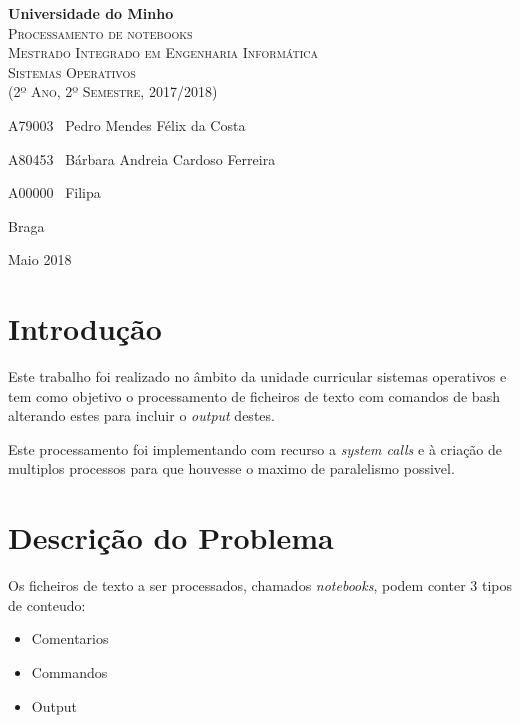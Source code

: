 \documentclass[12pt,a4paper]{report}
\begin{document}
\newcommand{\outputStart}[0]{$>>>$}
\newcommand{\outputEnd}[0]{$<<<$}

\begin{titlepage}
    \center
    {\huge {\bf Universidade do Minho}}\\[0.4cm]
    \vspace{3.0cm}
    \textsc{\huge{Processamento de notebooks}}\\[0.5cm]
    \vspace{3.0cm}
    \textsc{\huge{Mestrado Integrado em Engenharia Informática}}\\[0.5cm]
    \vspace{2.0cm}
    \textsc{Sistemas Operativos}\\[0.5cm]
    \textsc{(2º Ano, 2º Semestre, 2017/2018)}\\[0.5cm]
    \vspace{1.5cm}
    \begin{flushleft}
        A79003 \,\,\,Pedro Mendes Félix da Costa
        \vspace{0.2cm}

        A80453 \,\,\,Bárbara Andreia Cardoso Ferreira
        \vspace{0.2cm}

        A00000 \,\,\,Filipa
    \end{flushleft}
        \vspace{1cm}
    \begin{flushright}
        Braga

        Maio 2018
    \end{flushright}

\end{titlepage}

\tableofcontents
\clearpage

\chapter{Introdução}
    Este trabalho foi realizado no âmbito da unidade curricular sistemas
    operativos e tem como objetivo o processamento de ficheiros de texto
    com comandos de bash alterando estes para incluir o \textit{output} destes.

    Este processamento foi implementando com recurso a \textit{system calls}
    e à criação de multiplos processos para que houvesse o maximo de
    paralelismo possivel.

\chapter{Descrição do Problema}
    Os ficheiros de texto a ser processados, chamados \textit{notebooks}, podem
    conter 3 tipos de conteudo:
    \begin{itemize}
        \item Comentarios
        \item Commandos
        \item Output
    \end{itemize}
\end{document}
